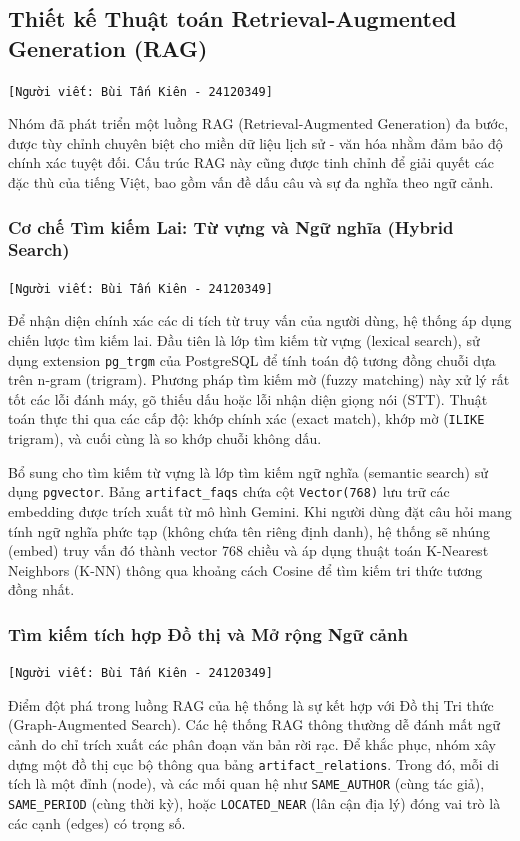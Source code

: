 \subsection{Thiết kế Thuật toán Retrieval-Augmented Generation (RAG)}
\texttt{[Người viết: Bùi Tấn Kiên - 24120349]}

Nhóm đã phát triển một luồng RAG (Retrieval-Augmented Generation) đa bước, được tùy chỉnh chuyên biệt cho miền dữ liệu lịch sử - văn hóa nhằm đảm bảo độ chính xác tuyệt đối. Cấu trúc RAG này cũng được tinh chỉnh để giải quyết các đặc thù của tiếng Việt, bao gồm vấn đề dấu câu và sự đa nghĩa theo ngữ cảnh.

\subsubsection{Cơ chế Tìm kiếm Lai: Từ vựng và Ngữ nghĩa (Hybrid Search)}
\texttt{[Người viết: Bùi Tấn Kiên - 24120349]}

Để nhận diện chính xác các di tích từ truy vấn của người dùng, hệ thống áp dụng chiến lược tìm kiếm lai. 
Đầu tiên là lớp tìm kiếm từ vựng (lexical search), sử dụng extension \texttt{pg\_trgm} của PostgreSQL để tính toán độ tương đồng chuỗi dựa trên n-gram (trigram). Phương pháp tìm kiếm mờ (fuzzy matching) này xử lý rất tốt các lỗi đánh máy, gõ thiếu dấu hoặc lỗi nhận diện giọng nói (STT). Thuật toán thực thi qua các cấp độ: khớp chính xác (exact match), khớp mờ (\texttt{ILIKE} trigram), và cuối cùng là so khớp chuỗi không dấu. 

Bổ sung cho tìm kiếm từ vựng là lớp tìm kiếm ngữ nghĩa (semantic search) sử dụng \texttt{pgvector}. Bảng \texttt{artifact\_faqs} chứa cột \texttt{Vector(768)} lưu trữ các embedding được trích xuất từ mô hình Gemini. Khi người dùng đặt câu hỏi mang tính ngữ nghĩa phức tạp (không chứa tên riêng định danh), hệ thống sẽ nhúng (embed) truy vấn đó thành vector 768 chiều và áp dụng thuật toán K-Nearest Neighbors (K-NN) thông qua khoảng cách Cosine để tìm kiếm tri thức tương đồng nhất.

\subsubsection{Tìm kiếm tích hợp Đồ thị và Mở rộng Ngữ cảnh}
\texttt{[Người viết: Bùi Tấn Kiên - 24120349]}

Điểm đột phá trong luồng RAG của hệ thống là sự kết hợp với Đồ thị Tri thức (Graph-Augmented Search). Các hệ thống RAG thông thường dễ đánh mất ngữ cảnh do chỉ trích xuất các phân đoạn văn bản rời rạc. Để khắc phục, nhóm xây dựng một đồ thị cục bộ thông qua bảng \texttt{artifact\_relations}. Trong đó, mỗi di tích là một đỉnh (node), và các mối quan hệ như \texttt{SAME\_AUTHOR} (cùng tác giả), \texttt{SAME\_PERIOD} (cùng thời kỳ), hoặc \texttt{LOCATED\_NEAR} (lân cận địa lý) đóng vai trò là các cạnh (edges) có trọng số.

